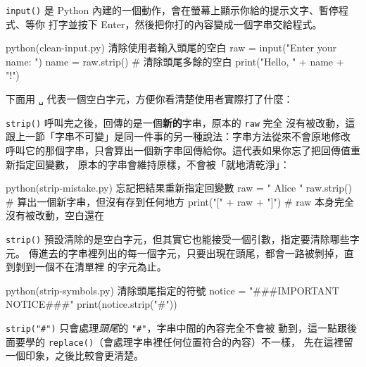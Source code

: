 \texttt{input()} 是 Python 內建的一個動作，會在螢幕上顯示你給的提示文字、暫停程式、等你
打字並按下 Enter，然後把你打的內容變成一個字串交給程式。

\begin{example}{python}{(clean-input.py) 清除使用者輸入頭尾的空白}
raw = input("Enter your name: ")
name = raw.strip()               # 清除頭尾多餘的空白
print("Hello, " + name + "!")
\end{example}

下面用 \texttt{␣} 代表一個空白字元，方便你看清楚使用者實際打了什麼：


\texttt{strip()} 呼叫完之後，回傳的是一個\textbf{新的}字串，原本的 \texttt{raw} 完全
沒有被改動，這跟上一節「字串不可變」是同一件事的另一種說法：字串方法從來不會原地修改
呼叫它的那個字串，只會算出一個新字串回傳給你。這代表如果你忘了把回傳值重新指定回變數，
原本的字串會維持原樣，不會被「就地清乾淨」：

\begin{example}{python}{(strip-mistake.py) 忘記把結果重新指定回變數}
raw = "   Alice   "
raw.strip()                  # 算出一個新字串，但沒有存到任何地方
print("[" + raw + "]")       # raw 本身完全沒有被改動，空白還在
\end{example}

\iosample{}{[␣␣␣Alice␣␣␣] \\}


\texttt{strip()} 預設清除的是空白字元，但其實它也能接受一個引數，指定要清除哪些字元。
傳進去的字串裡列出的每一個字元，只要出現在頭尾，都會一路被剝掉，直到剝到一個不在清單裡
的字元為止。

\begin{example}{python}{(strip-symbols.py) 清除頭尾指定的符號}
notice = "###IMPORTANT NOTICE###"
print(notice.strip("#"))
\end{example}


\texttt{strip("\#")} 只會處理\textit{頭尾}的 \texttt{"\#"}，字串中間的內容完全不會被
動到，這一點跟後面要學的 \texttt{replace()}（會處理字串裡任何位置符合的內容）不一樣，
先在這裡留一個印象，之後比較會更清楚。

